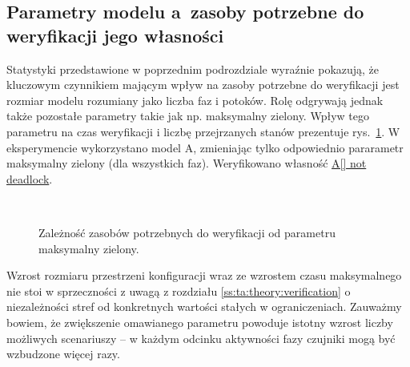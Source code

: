 \documentclass{pracamgr}
\newcommand{\imgr}[1]{rys.~\ref{#1}}
\newcommand{\ttt}[1]{\url{#1}}
\theoremstyle{plain}
\begin{document}
\subsection{Parametry modelu a~zasoby potrzebne do weryfikacji jego
  własności}
Statystyki przedstawione w poprzednim podrozdziale wyraźnie pokazują,
że kluczowym czynnikiem mającym wpływ na zasoby potrzebne do
weryfikacji jest rozmiar modelu rozumiany jako liczba faz i
potoków. Rolę odgrywają jednak także pozostałe parametry takie jak
np. maksymalny zielony.  Wpływ tego parametru na czas weryfikacji i
liczbę przejrzanych stanów prezentuje \imgr{img:max-time-chart}. W
eksperymencie wykorzystano model A, zmieniając tylko odpowiednio
pararametr maksymalny zielony (dla wszystkich faz). Weryfikowano
własność \ttt{A[] not deadlock}.
\begin{figure}
  \centering
  \\
  \caption{Zależność zasobów potrzebnych do weryfikacji od parametru maksymalny zielony.}
  \label{img:max-time-chart}
\end{figure}

Wzrost rozmiaru przestrzeni konfiguracji wraz ze wzrostem czasu
maksymalnego nie stoi w sprzeczności z uwagą z rozdziału
\ref{ss:ta:theory:verification} o niezależności stref od
konkretnych wartości stałych w ograniczeniach. Zauważmy bowiem, że
zwiększenie omawianego parametru powoduje istotny wzrost liczby
możliwych scenariuszy -- w każdym odcinku aktywności fazy czujniki
mogą być wzbudzone więcej razy.
\end{document}
